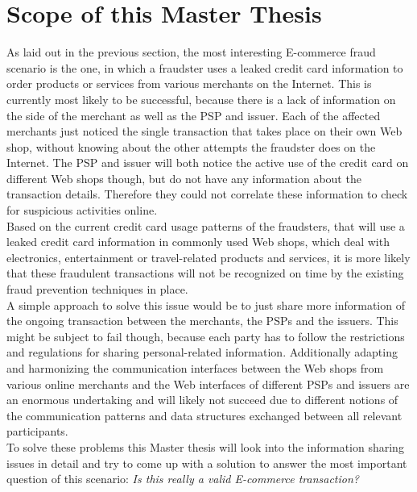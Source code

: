 
\section{Scope of this Master Thesis}
\label{sec:scope_thesis}

As laid out in the previous section, the most interesting \gls{E-commerce} fraud scenario is the one, in which a fraudster uses a leaked credit card information to order products or services from various merchants on the Internet. This is currently most likely to be successful, because there is a lack of information on the side of the merchant as well as the \gls{PSP} and issuer. Each of the affected merchants just noticed the single transaction that takes place on their own Web shop, without knowing about the other attempts the fraudster does on the Internet. The \gls{PSP} and issuer will both notice the active use of the credit card on different Web shops though, but do not have any information about the transaction details. Therefore they could not correlate these information to check for suspicious activities online. \\

Based on the current credit card usage patterns of the fraudsters, that will use a leaked credit card information in commonly used Web shops, which deal with electronics, entertainment or travel-related products and services, it is more likely that these fraudulent transactions will not be recognized on time by the existing fraud prevention techniques in place. \\

A simple approach to solve this issue would be to just share more information of the ongoing transaction between the merchants, the \gls{PSP}s and the issuers. This might be subject to fail though, because each party has to follow the restrictions and regulations for sharing personal-related information. Additionally adapting and harmonizing the communication interfaces between the Web shops from various online merchants and the Web interfaces of different \gls{PSP}s and issuers are an enormous undertaking and will likely not succeed due to different notions of the communication patterns and data structures exchanged between all relevant participants. \\

To solve these problems this Master thesis will look into the information sharing issues in detail and try to come up with a solution to answer the most important question of this scenario: \textit{Is this really a valid \gls{E-commerce} transaction?} \\

